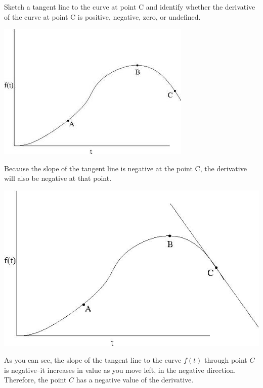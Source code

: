 \documentclass{ximera}
\author{Emma Smith Zbarsky}
\begin{document}
\begin{exercise}

Sketch a tangent line to the curve at point C and identify whether the
derivative of the curve at point C is positive, negative, zero, or
undefined.



\begin{image}\includegraphics[width=.5\textwidth]{slopedgraph.jpg}\end{image}


\begin{hint}
Because the slope of the tangent line is negative at the point C, the
derivative will also be negative at that point.
\end{hint}


\begin{hint}
\begin{image}\includegraphics[width=.5\textwidth]{slopegraphtangentC.jpg}\end{image}

 As you can see, the slope of the tangent
line to the curve $f(t)$ through point $C$ is negative--it increases in
value as you move left, in the negative direction. Therefore, the point
$C$ has a negative value of the derivative.
\end{hint}


\begin{multipleChoice}
\end{multipleChoice}

\end{exercise}
\end{document}
